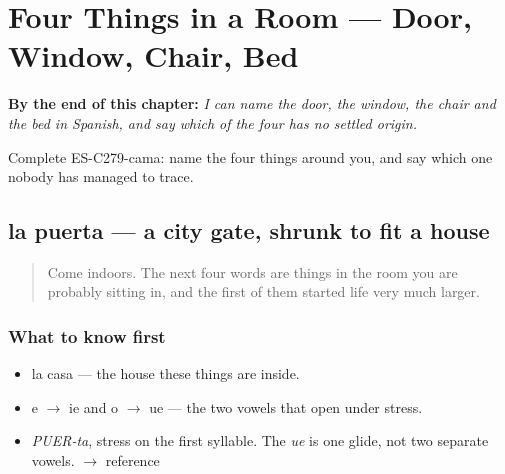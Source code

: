
\chapter{Four Things in a Room --- Door, Window, Chair, Bed}
\label{ch:la-habitacion}

\begin{chapteropening}
\textbf{By the end of this chapter:} \emph{I can name the door, the window, the chair and the bed in Spanish, and say which of the four has no settled origin.}

Complete ES-C279-cama: name the four things around you, and say which one nobody has managed to trace.
\end{chapteropening}

\section[la puerta]{la puerta — a city gate, shrunk to fit a house}

\label{lesson:ES-C279-puerta}



\begin{quote}
Come indoors. The next four words are things in the room you are probably sitting in, and the first of them started life very much larger.
\end{quote}

\subsection*{What to know first}
\begin{itemize}
\raggedright
  \item la casa — the house these things are inside.
  \item e $\to$ ie and o $\to$ ue — the two vowels that open under stress.
\end{itemize}

\begin{sounds}
\begin{itemize}
\raggedright
  \item \emph{PUER-ta}, stress on the first syllable. The \emph{ue} is one glide, not two separate vowels. $\to$ reference
\end{itemize}
\end{sounds}

